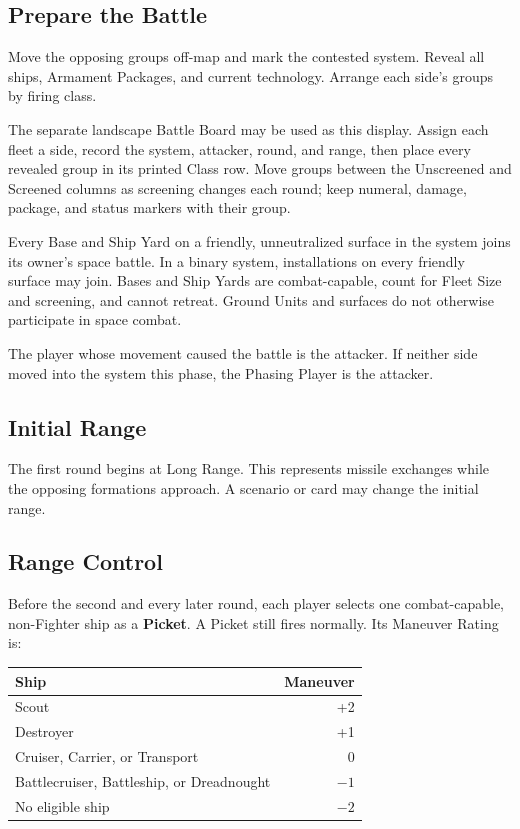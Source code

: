 \subsection{Prepare the Battle}

Move the opposing groups off-map and mark the contested system. Reveal all
ships, Armament Packages, and current technology. Arrange each side's groups by
firing class.

The separate landscape Battle Board may be used as this display. Assign each
fleet a side, record the system, attacker, round, and range, then place every
revealed group in its printed Class row. Move groups between the Unscreened and
Screened columns as screening changes each round; keep numeral, damage,
package, and status markers with their group.

Every Base and Ship Yard on a friendly, unneutralized surface in the system
joins its owner's space battle. In a binary system, installations on every
friendly surface may join. Bases and Ship Yards are combat-capable, count for
Fleet Size and screening, and cannot retreat. Ground Units and surfaces do not
otherwise participate in space combat.

The player whose movement caused the battle is the attacker. If neither side
moved into the system this phase, the Phasing Player is the attacker.

\subsection{Initial Range}

The first round begins at Long Range. This represents missile exchanges while
the opposing formations approach. A scenario or card may change the initial
range.

\subsection{Range Control}

Before the second and every later round, each player selects one
combat-capable, non-Fighter ship as a \textbf{Picket}. A Picket still fires
normally. Its Maneuver Rating is:

\begin{tabularx}{\columnwidth}{@{}Xr@{}}
\toprule
Ship & Maneuver \\
\midrule
Scout & +2 \\
Destroyer & +1 \\
Cruiser, Carrier, or Transport & 0 \\
Battlecruiser, Battleship, or Dreadnought & $-1$ \\
No eligible ship & $-2$ \\
\bottomrule
\end{tabularx}

